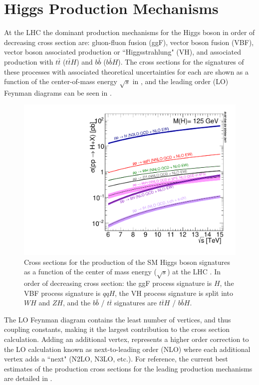 \section{Higgs Production Mechanisms} \label{sec:higgs:production}

At the LHC the dominant production mechanisms for the Higgs boson in order of
decreasing cross section are: gluon-fluon fusion (ggF), vector boson fusion
(VBF), vector boson associated production or ``Higgsstrahlung" (VH), and
associated production with $t\bar{t}$ ($t\bar{t}H$) and $b\bar{b}$
($b\bar{b}H$).  The cross sections for the signatures of these processes with
associated theoretical uncertainties for each are shown as a function of the
center-of-mass energy $\sqrt{s}$ in , and the
leading order (LO) Feynman diagrams can be seen in .

\begin{figure}[!htbp]
  \begin{center}
    \includegraphics[width=0.5\linewidth]{figures/higgs/higgs_xsection.pdf}
    \caption{Cross sections for the production of the SM Higgs boson signatures
as a function of the center of mass energy ($\sqrt{s}$) at the LHC
\cite{PDG2018:Ch11}.  In order of decreasing cross section: the ggF process
signature is $H$, the VBF process signature is $qqH$, the VH process signature
is split into $WH$ and $ZH$, and the $b\bar{b}$ / $t\bar{t}$ signatures are
$t\bar{t}H$ / $b\bar{b}H$.}
    \label{fig:higgs_xsection}
  \end{center}
\end{figure}

The LO Feynman diagram contains the least number of vertices, and thus coupling
constants, making it the largest contribution to the cross section calculation.
Adding an additional vertex, represents a higher order correction to the LO
calculation known as next-to-leading order (NLO) where each additional vertex
adds a ``next" (N2LO, N3LO, etc.). For reference, the current best
estimates of the production cross sections for the leading production
mechanisms are detailed in .

